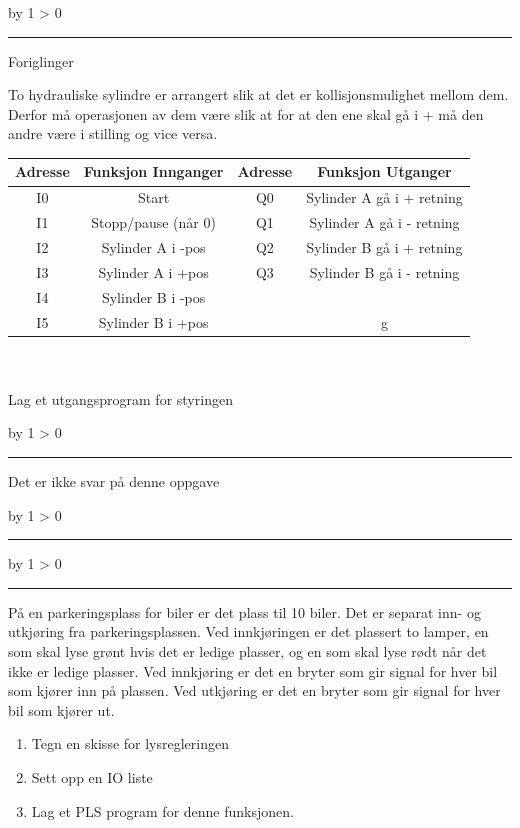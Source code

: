 \documentclass[12pt,a4paper]{article}
\def\oppgave{
            \advance\questnum by 1
            \ifnum \questnum > 0
                 \hrule
                 \vskip 3pt
                 \leftline{Oppgave \the\questnum}
                 \vskip 3pt \fi}
\def\svar{
           \advance\answnum by 1
           \ifnum \answnum > 0
                \hrule
                \vskip 3pt
                \leftline{Svar \the\answnum}
                \vskip 3pt \fi}
\def\notes{
           \advance\explnum by 1
           \ifnum \explnum > 0
                \hrule
                \vskip 3pt
                \leftline{Notes \the\explnum}
                \vskip 3pt \fi}
\begin{document}
\oppgave{} 


Foriglinger

To hydrauliske sylindre er arrangert slik at det er kollisjonsmulighet
mellom dem. Derfor må operasjonen av dem være slik at for at den ene
skal gå i + må den andre være i \textendash stilling og vice versa. 

\begin{tabular}{|c|c|c|c|}
\hline 
Adresse & Funksjon Innganger & Adresse & Funksjon Utganger\tabularnewline
\hline 
\hline 
I0 & Start & Q0 & Sylinder A gå i + retning\tabularnewline
\hline 
I1 & Stopp/pause (når 0) & Q1 & Sylinder A gå i - retning\tabularnewline
\hline 
I2 & Sylinder A i -pos & Q2 & Sylinder B gå i + retning\tabularnewline
\hline 
I3 & Sylinder A i +pos & Q3 & Sylinder B gå i - retning\tabularnewline
\hline 
I4 & Sylinder B i -pos &  & \tabularnewline
\hline 
I5 & Sylinder B i +pos &  & g\tabularnewline
\hline 
\end{tabular}
\\
\\
Lag et utgangsprogram for styringen
\vskip 10pt

\vskip 10pt \filbreak 





\svar{} 
Det er ikke svar på denne oppgave
\vskip 10pt \filbreak 





\notes{} 



\vfil \eject 





\oppgave{} 


På en parkeringsplass for biler er det plass til 10 biler. Det er
separat inn- og utkjøring fra parkeringsplassen. Ved innkjøringen
er det plassert to lamper, en som skal lyse grønt hvis det er ledige
plasser, og en som skal lyse rødt når det ikke er ledige plasser.
Ved innkjøring er det en bryter som gir signal for hver bil som kjører
inn på plassen. Ved utkjøring er det en bryter som gir signal for
hver bil som kjører ut.
\begin{enumerate}
\item Tegn en skisse for lysregleringen
\item Sett opp en IO liste
\item Lag et PLS program for denne funksjonen.
\end{enumerate}
\end{document}
